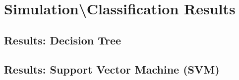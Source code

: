 \documentclass[fleqn]{article}
\begin{document}
\section[Results]{Simulation\textbackslash Classification Results}
\label{sec:Results}

\subsection{Results: Decision Tree}
\label{sub:resultsTrees}

\subsection{Results: Support Vector Machine (SVM)}
\label{sub:resultsSVM}
\end{document}

